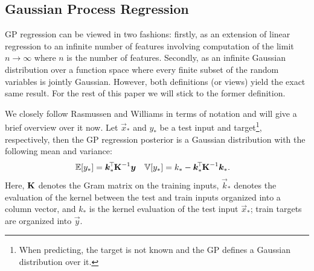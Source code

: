 \subsection{Gaussian Process Regression}

	\ac{GP} regression can be viewed in two fashions:
	firstly, as an extension of linear regression to an infinite number of features involving computation of the limit $n \to \infty$ where $n$ is the number of features.
	Secondly, as an infinite Gaussian distribution over a function space where every finite subset of the random variables is jointly Gaussian.
	However, both definitions (or views) yield the exact same result.
	For the rest of this paper we will stick to the former definition.

	We closely follow Rasmussen and Williams\cite{rasmussenGaussianProcessesMachine2006} in terms of notation and will give a brief overview over it now.
	Let \(\vec{x}_\ast\) and \(y_\ast\) be a test input and target\footnote{When predicting, the target is not known and the \ac{GP} defines a Gaussian distribution over it.}, respectively, then the \ac{GP} regression posterior is a Gaussian distribution with the following mean and variance:
	\begin{equation}
		\begin{aligned}
			\mathbb{E}[y_\ast] &= \bm{k}_\ast^{\!\top\!} \bm{\mathrm{K}}^{-1} \bm{y} &
			\mathbb{V}[y_\ast] &= k_\ast - \bm{k}_\ast^{\!\top\!} \bm{\mathrm{K}}^{-1} \bm{k}_\ast.
		\end{aligned}
		\label{eq:gp}
	\end{equation}
	Here, \( \bm{\mathrm{K}} \) denotes the Gram matrix on the training inputs, \(\vec{k}_\ast\) denotes the evaluation of the kernel between the test and train inputs organized into a column vector, and \(k_\ast\) is the kernel evaluation of the test input \(\vec{x}_\ast\); train targets are organized into \(\vec{y}\).

